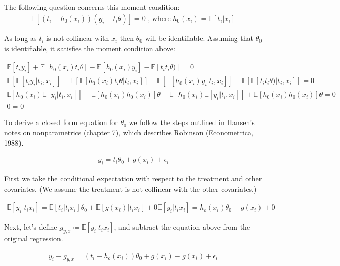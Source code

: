 \documentclass[12pt]{article}
\newcommand{\E}{\mathbb{E}}
\begin{document}
\subsection{}

The following question concerns this moment condition:
\begin{gather*}
\E[(t_i - h_0(x_i))(y_i - t_i\theta)] = 0 \text{  , where }  h_0(x_i) = \E[t_i | x_i]
\end{gather*}

As long as $t_i$ is not collinear with $x_i$ then $\theta_0$ will be identifiable. Assuming that $\theta_0$ is identifiable, it satisfies the moment condition above:

\begin{gather*}
\E[t_i y_i] + \E[h_0(x_i)t_i\theta] - \E[h_0(x_i)y_i] - \E[t_i t_i\theta)] = 0 \\
\E[\E[t_i y_i |t_i, x_i]] + \E[\E[h_0(x_i)t_i\theta|t_i, x_i]]  - \E[\E[h_0(x_i)y_i |t_i, x_i]]  + \E[\E[t_it_i\theta) |t_i, x_i]]  = 0 \\
\E[h_0(x_i) \E[y_i |t_i, x_i]] + \E[h_0(x_i)h_0(x_i)]\theta  - \E[h_0(x_i) \E[y_i |t_i, x_i]]  + \E[h_0(x_i)h_0(x_i)]\theta   = 0 \\
0=0
\end{gather*}

To derive a closed form equation for $\theta_0$ we follow the steps outlined in Hansen's notes on nonparametrics (chapter 7), which describes Robinson (Econometrica, 1988).

\begin{gather*}
y_i = t_i\theta_0 + g(x_i) + \epsilon_i
\end{gather*}

First we take the conditional expectation with respect to the treatment and other covariates. (We assume the treatment is not collinear with the other covariates.)

\begin{gather*}
\E[y_i|t_i x_i] = \E[t_i|t_i x_i]\theta_0 + \E[g(x_i)|t_i x_i]  + 0
\E[y_i|t_i x_i] = h_o(x_i)\theta_0 + g(x_i) + 0
\end{gather*}

Next, let's define $ g_{y,x}  \coloneqq \E[y_i|t_i x_i]$, and subtract the equation above from the original regression.


\begin{gather*}
y_i - g_{y,x} = (t_i -  h_o(x_i))\theta_0 + g(x_i) - g(x_i) + \epsilon_i
\end{gather*}
\end{document}
